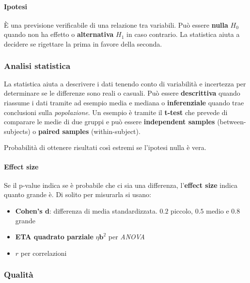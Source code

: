 \paragraph{Ipotesi} È una previsione verificabile di una relazione tra variabili. Può essere \textbf{nulla} $H_0$ quando non ha effetto o \textbf{alternativa} $H_1$ in caso contrario. La statistica aiuta a decidere se rigettare la prima in favore della seconda.

\subsubsection{Analisi statistica}
La statistica aiuta a descrivere i dati tenendo conto di variabilità e incertezza per determinare se le differenze sono reali o casuali. Può essere \textbf{descrittiva} quando riassume i dati tramite ad esempio media e mediana o \textbf{inferenziale} quando trae conclusioni sulla \textit{popolazione}. Un esempio è tramite il \textbf{t-test} che prevede di comparare le medie di due gruppi e può essere \textbf{independent samples} (between-subjects) o \textbf{paired samples} (within-subject).

\begin{definition}[p-value]
	Probabilità di ottenere risultati così estremi se l'ipotesi nulla è vera.
\end{definition}

\paragraph{Effect size} Se il p-value indica se è probabile che ci sia una differenza, l'\textbf{effect size} indica quanto grande è. Di solito per misurarla si usano:
\begin{itemize}
	\item \textbf{Cohen's d}: differenza di media standardizzata. $0.2$ piccolo, $0.5$ medio e $0.8$ grande
	\item \textbf{ETA quadrato parziale} $\eta \mathbf{b}^2$ per \textit{ANOVA}
	\item $r$ per correlazioni
\end{itemize}

\subsubsection{Qualità}
